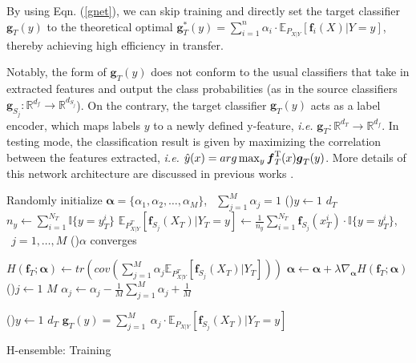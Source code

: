 \documentclass[letterpaper]{article} %
\begin{document}
By using Eqn. (\ref{gnet}), we can %
skip training and directly set the target classifier $\boldsymbol{g}_T(y)$ to the theoretical optimal $\boldsymbol{g}_T^*(y) = \sum_{i=1}^n\alpha_i \cdot \mathbb{E}_{P_{X|Y}}[\boldsymbol{f}_i(X)|Y=y]$, thereby achieving high efficiency in transfer. %

Notably, the form of $\boldsymbol{g}_T(y)$ does not conform to the usual classifiers that take in extracted features and output the class probabilities (as in the source classifiers $\boldsymbol{g}_{S_j}: \mathbb{R}^{d_f} \to \mathbb{R}^{d_{S_j}}$). On the contrary, the target classifier $\boldsymbol{g}_T(y)$
acts as a label encoder, %
which maps labels $y$ to a newly defined y-feature, \textit{i.e.} $\boldsymbol{g}_T: \mathbb{R}^{d_T} \to \mathbb{R}^{d_{f}}$. In testing mode, the classification result is given by maximizing the correlation between the features extracted, \textit{i.e.} $\hat{y}(x) = arg\max_y \boldsymbol{f}^{\rm T}_T(x) \boldsymbol{g}_T(y)$. More details of this network architecture are discussed in previous works \citep{huang2019universal}.


\begin{algorithm*}[!h]
    Randomly initialize $\boldsymbol{\alpha}=\{\alpha_1,\alpha_2,\dots,\alpha_M\}$, $\ \ \sum_{j=1}^M \alpha_j = 1$ \;
    \For(){$y \gets 1$ \KwTo $d_T$}{
          $n_y \gets \sum_{i = 1}^{N_T} \mathbb{I}\{y = y^i_T\}$ \;
          $\mathbb{E}_{P^T_{X|Y}} [\boldsymbol{f}_{S_j}(X_T)|Y_T = y] \gets \frac{1}{n_y} \sum_{i = 1}^{N_T} \boldsymbol{f}_{S_j}(x_T^i) \cdot \mathbb{I}\{y = y^i_T\}$, $\ \ j = 1,\dots,M$
          }
    \Repeat(){$\alpha$ converges}{

          $H(\boldsymbol{f}_T;\boldsymbol{\alpha}) \gets tr(cov(\sum_{j=1}^M \alpha_j \mathbb{E}_{P^T_{X|Y}}[\boldsymbol{f}_{S_j}(X_T)|Y_T]))$\;
          $\boldsymbol{\alpha} \gets \boldsymbol{\alpha} + \lambda \nabla_{\boldsymbol{\alpha}} H(\boldsymbol{f}_T; \boldsymbol{\alpha})$\;
          \For(){$j \gets 1$ \KwTo $M$}{
          $\alpha_j \gets \alpha_j - \frac{1}{M} \sum_{j=1}^M \alpha_j + \frac{1}{M}$
          }
        }
    \For(){$y \gets 1$ \KwTo $d_T$}{
          $\boldsymbol{g}_T(y) =   \sum_{j=1}^M\ \alpha_j \cdot \mathbb{E}_{P_{X|Y}}[\boldsymbol{f}_{S_j}(X_T)|Y_T=y] $
          }
\caption{H-ensemble: Training}
\label{htrain}
\end{algorithm*}
\end{document}
